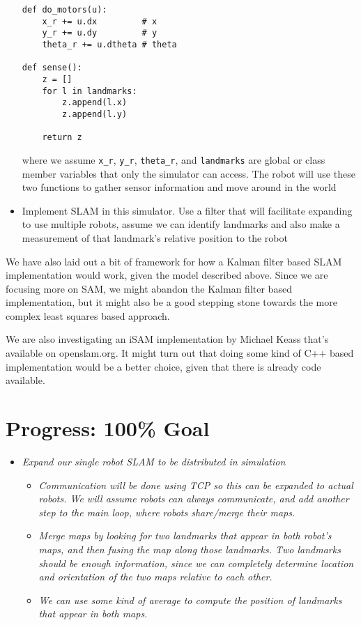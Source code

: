 \documentclass[11pt]{article}
\begin{document}
\begin{itemize}
\begin{verbatim}
def do_motors(u):
    x_r += u.dx         # x
    y_r += u.dy         # y
    theta_r += u.dtheta # theta

def sense():
    z = []
    for l in landmarks:
        z.append(l.x)
        z.append(l.y)
        
    return z
\end{verbatim}
where we assume \texttt{x\_r}, \texttt{y\_r}, \texttt{theta\_r}, and \texttt{landmarks} are global or class member variables that only the simulator can access. The robot will use these two functions to gather sensor information and move around in the world
        
    \item Implement SLAM in this simulator. Use a filter that will facilitate expanding to use multiple robots, assume we can identify landmarks and also make a measurement of that landmark's relative position to the robot
\end{itemize}

We have also laid out a bit of framework for how a Kalman filter based SLAM implementation would work, given the model described above. Since we are focusing more on SAM, we might abandon the Kalman filter based implementation, but it might also be a good stepping stone towards the more complex least squares based approach. 

We are also investigating an iSAM implementation by Michael Keass \cite{isam1} that's available on openslam.org. It might turn out that doing some kind of C++ based implementation would be a better choice, given that there is already code available.

\section{Progress: 100\% Goal}

\begin{itemize}
    \item \emph{Expand our single robot SLAM to be distributed in simulation}
    \begin{itemize}
        \item \emph{Communication will be done using TCP so this can be expanded to actual robots. We will assume robots can always communicate, and add another step to the main loop, where robots share/merge their maps.}
        \item \emph{Merge maps by looking for two landmarks that appear in both robot's maps, and then fusing the map along those landmarks. Two landmarks should be enough information, since we can completely determine location and orientation of the two maps relative to each other.}
        \item \emph{We can use some kind of average to compute the position of landmarks that appear in both maps.}
    \end{itemize}
\end{itemize}
\end{document}
